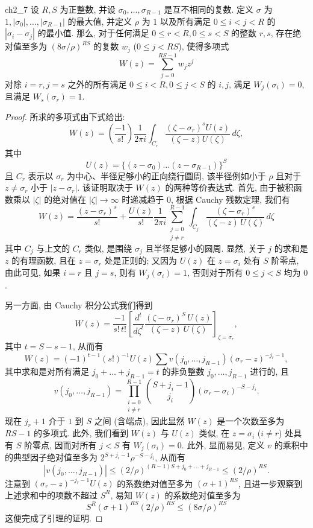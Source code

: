 \begin{mylemma}{}{ch2_7}
设 $R, S$ 为正整数, 并设 $\sigma_0, \dots, \sigma_{R-1}$ 是互不相同的复数. 定义 $\sigma$ 为 $1, |\sigma_0|, \dots, |\sigma_{R-1}|$ 的最大值, 并定义 $\rho$ 为 $1$ 以及所有满足 $0 \le i < j < R$ 的 $|\sigma_i - \sigma_j|$ 的最小值. 那么, 对于任何满足 $0 \le r < R, 0 \le s < S$ 的整数 $r, s$, 存在绝对值至多为 $(8\sigma/\rho)^{RS}$ 的复数 $w_j$ ($0 \le j < RS$), 使得多项式
\[
W(z) = \sum_{j=0}^{RS-1} w_j z^j
\]
对除 $i=r, j=s$ 之外的所有满足 $0 \le i < R, 0 \le j < S$ 的 $i, j$, 满足 $W_j(\sigma_i) = 0$, 且满足 $W_s(\sigma_r) = 1$.
\end{mylemma}

\begin{proof}
所求的多项式由下式给出:
\[
W(z) = \left(\frac{-1}{s!}\right) \frac{1}{2\pi i} \int_{C_r} \frac{(\zeta - \sigma_r)^s U(z)}{(\zeta - z) U(\zeta)} \, d\zeta,
\]
其中
\[
U(z) = \{(z - \sigma_0) \dots (z - \sigma_{R-1})\}^S
\]
且 $C_r$ 表示以 $\sigma_r$ 为中心、半径足够小的正向绕行圆周, 该半径例如小于 $\rho$ 且对于 $z \neq \sigma_r$ 小于 $|z - \sigma_r|$. 该证明取决于 $W(z)$ 的两种等价表达式. 首先, 由于被积函数乘以 $|\zeta|$ 的绝对值在 $|\zeta| \to \infty$ 时递减趋于 $0$, 根据 Cauchy 残数定理, 我们有
\[
W(z) = \frac{(z-\sigma_r)^s}{s!} + \frac{U(z)}{s!} \frac{1}{2\pi i} \sum_{\substack{j=0\\j\neq r}}^{R-1} \int_{C_j} \frac{(\zeta-\sigma_r)^s}{(\zeta-z) \, U(\zeta)} \, d\zeta
\]
其中 $C_j$ 与上文的 $C_r$ 类似, 是围绕 $\sigma_j$ 且半径足够小的圆周. 显然, 关于 $j$ 的求和是 $z$ 的有理函数, 且在 $z = \sigma_r$ 处是正则的; 又因为 $U(z)$ 在 $z = \sigma_i$ 处有 $S$ 阶零点, 由此可见, 如果 $i = r$ 且 $j = s$, 则有 $W_j(\sigma_i) = 1$, 否则对于所有 $0 \le j < S$ 均为 $0$.

另一方面, 由 Cauchy 积分公式我们得到
\[
W(z) = \frac{-1}{s!\,t!} \left[ \frac{d^t}{d\zeta^t} \frac{(\zeta - \sigma_r)^S \, U(z)}{(\zeta - z) \, U(\zeta)} \right]_{\zeta = \sigma_r},
\]
其中 $t = S - s - 1$, 从而有
\[
W(z) = (-1)^{t-1} (s!)^{-1} U(z) \sum v(j_0, \dots, j_{R-1}) (\sigma_r - z)^{-j_r - 1},
\]
其中求和是对所有满足 $j_0 + \dots + j_{R-1} = t$ 的非负整数 $j_0, \dots, j_{R-1}$ 进行的, 且
\[
v(j_0, \dots, j_{R-1}) = \prod_{\substack{i=0\\i\neq r}}^{R-1} \binom{S+j_i-1}{j_i} (\sigma_r - \sigma_i)^{-S-j_i}.
\]
现在 $j_r + 1$ 介于 $1$ 到 $S$ 之间 (含端点), 因此显然 $W(z)$ 是一个次数至多为 $RS - 1$ 的多项式. 此外, 我们看到 $W(z)$ 与 $U(z)$ 类似, 在 $z = \sigma_i$ ($i \neq r$) 处具有 $S$ 阶零点, 因而对所有 $j < S$ 有 $W_j(\sigma_i) = 0$. 此外, 显而易见, 定义 $v$ 的乘积中的典型因子绝对值至多为 $2^{S+j_i-1}\rho^{-S-j_i}$, 从而有
\[
|v(j_0, \dots, j_{R-1})| \le (2/\rho)^{(R-1)S+j_0+\dots+j_{R-1}} \le (2/\rho)^{RS}.
\]
注意到 $(\sigma_r - z)^{-j_r - 1} U(z)$ 的系数绝对值至多为 $(\sigma + 1)^{RS}$, 且进一步观察到上述求和中的项数不超过 $S^R$, 易知 $W(z)$ 的系数绝对值至多为
\[
S^R(\sigma+1)^{RS} (2/\rho)^{RS} \le (8\sigma/\rho)^{RS}
\]
这便完成了引理的证明.
\end{proof}

